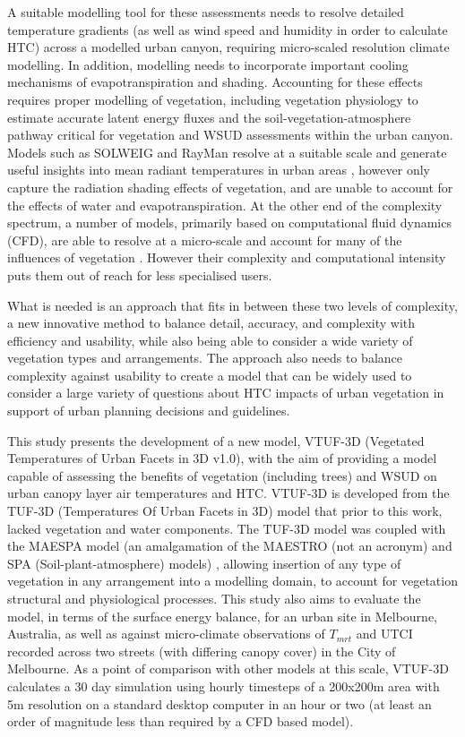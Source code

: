 \documentclass[final,3p,times,authoryear]{elsarticle}
\begin{document}
A suitable modelling tool for these assessments needs to resolve detailed temperature gradients (as well as wind speed and humidity in order to calculate HTC) across a modelled urban canyon, requiring micro-scaled resolution climate modelling. In addition, modelling needs to incorporate important cooling mechanisms of evapotranspiration and shading. Accounting for these effects requires proper modelling of vegetation, including vegetation physiology to estimate accurate latent energy fluxes and the soil-vegetation-atmosphere pathway critical for vegetation and WSUD assessments within the urban canyon. Models such as SOLWEIG \citep{Lindberg2008a} and RayMan \citep{Matzarakis2007,Matzarakis2010} resolve at a suitable scale and generate useful insights into mean radiant temperatures in urban areas \citep{Chen2014a}, however only capture the radiation shading effects of vegetation, and are unable to account for the effects of water and evapotranspiration. At the other end of the complexity spectrum, a number of models, primarily based on computational fluid dynamics (CFD), are able to resolve at a micro-scale and account for many of the influences of vegetation \citep{Bailey2014,Bailey2016,Kunz2000,Schlunzen2011a,Yamada2011,Bruse1999}. However their complexity and computational intensity puts them out of reach for less specialised users. 


What is needed is an approach that fits in between these two levels of complexity, a new innovative method to balance detail, accuracy, and complexity with efficiency and usability, while also being able to consider a wide variety of vegetation types and arrangements.  The approach also needs to balance complexity against usability to create a model that can be widely used to consider a large variety of questions about HTC impacts of urban vegetation in support of urban planning decisions and guidelines. 

This study presents the development of a new model, VTUF-3D (Vegetated Temperatures of Urban Facets in 3D v1.0), with the aim of providing a model capable of assessing the benefits of vegetation (including trees) and WSUD on urban canopy layer air temperatures and HTC. VTUF-3D is developed from the TUF-3D (Temperatures Of Urban Facets in 3D) model \citep{Krayenhoff2007} that prior to this work, lacked vegetation and water components. The TUF-3D model was coupled with the MAESPA model (an amalgamation of the MAESTRO (not an acronym) and SPA (Soil-plant-atmosphere) models)  \citep{Duursma2012}, allowing insertion of any type of vegetation in any arrangement into a modelling domain, to account for vegetation structural and physiological processes. This study also aims to evaluate the model, in terms of the surface energy balance, for an urban site in Melbourne, Australia, as well as against micro-climate observations of $T_{mrt}$ and UTCI recorded across two streets (with differing canopy cover) in the City of Melbourne. As a point of comparison with other models at this scale, VTUF-3D calculates a 30 day simulation using hourly timesteps of a 200x200m area with 5m resolution on a standard desktop computer in an hour or two (at least an order of magnitude less than required by a CFD based model).
\end{document}
